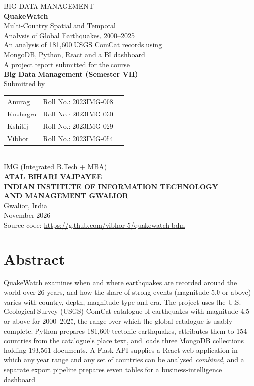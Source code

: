 \documentclass[11pt,a4paper]{article}
\newcommand{\repo}{\url{https://github.com/vibhor-5/quakewatch-bdm}}
\begin{document}
\begin{titlepage}
\centering\vspace*{1.2cm}
{\large BIG DATA MANAGEMENT}\\[1.2cm]
{\Huge\bfseries QuakeWatch}\\[0.4cm]
{\Large Multi-Country Spatial and Temporal\\Analysis of Global Earthquakes, 2000--2025}\\[0.6cm]
{\large An analysis of 181,600 USGS ComCat records using\\MongoDB, Python, React and a BI dashboard}\\[1.6cm]
A project report submitted for the course\\\textbf{Big Data Management (Semester VII)}\\[1.2cm]
Submitted by\\[0.3cm]
\begin{tabular}{lll}
Anurag & Roll No.: 2023IMG-008 \\
Kushagra & Roll No.: 2023IMG-030 \\
Kshitij & Roll No.: 2023IMG-029 \\
Vibhor & Roll No.: 2023IMG-054 \\
\end{tabular}\\[0.8cm]
IMG (Integrated B.Tech + MBA)\\[0.8cm]
{\bfseries ATAL BIHARI VAJPAYEE\\INDIAN INSTITUTE OF INFORMATION TECHNOLOGY\\AND MANAGEMENT GWALIOR}\\
Gwalior, India\\[0.6cm]
November 2026\\[1cm]
{\small Source code: \repo}
\end{titlepage}

\section*{Abstract}
QuakeWatch examines when and where earthquakes are recorded around the world over 26 years, and how the share of strong events (magnitude 5.0 or above) varies with country, depth, magnitude type and era. The project uses the U.S. Geological Survey (USGS) ComCat catalogue of earthquakes with magnitude 4.5 or above for 2000--2025, the range over which the global catalogue is usably complete. Python prepares 181,600 tectonic earthquakes, attributes them to 154 countries from the catalogue's place text, and loads three MongoDB collections holding 193,561 documents. A Flask API supplies a React web application in which any year range and any set of countries can be analysed \emph{combined}, and a separate export pipeline prepares seven tables for a business-intelligence dashboard.
\end{document}
